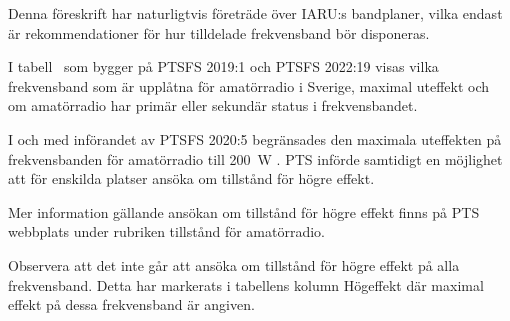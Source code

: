 Denna föreskrift har naturligtvis företräde över IARU:s bandplaner, vilka
endast är rekommendationer för hur tilldelade frekvensband bör disponeras.

I tabell~ som bygger på PTSFS 2019:1 och PTSFS 2022:19 visas
vilka frekvensband som är upplåtna för amatörradio i Sverige, maximal uteffekt
och om amatörradio har primär eller sekundär status i frekvensbandet.

I och med införandet av PTSFS 2020:5 begränsades den maximala uteffekten på
frekvensbanden för amatörradio till \qty{200}{\watt} \pep.
PTS införde samtidigt en möjlighet att för enskilda platser ansöka om tillstånd
för högre effekt.

Mer information gällande ansökan om tillstånd för högre effekt finns på PTS
webbplats under rubriken tillstånd för amatörradio.

Observera att det inte går att ansöka om tillstånd för högre effekt på alla
frekvensband. Detta har markerats i tabellens kolumn Högeffekt där maximal
effekt på dessa frekvensband är angiven.

